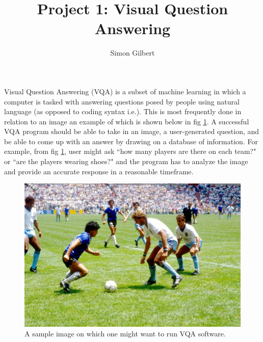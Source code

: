 \documentclass[manuscript,11pt]{article}
\begin{document}
\title{\Large Project 1: Visual Question Answering}
\author{Simon Gilbert}
\maketitle 
Visual Question Answering (VQA) is a subset of machine learning in which a computer is tasked with answering questions posed by people using natural language (as opposed to coding syntax i.e.).  This is most frequently done in relation to an image an example of which is shown below in fig \ref{soccer}. A successful VQA program should be able to take in an image, a user-generated question, and be able to come up with an answer by drawing on a database of information. For example, from fig \ref{soccer}, user might ask ``how many players are there on each team?" or  ``are the players wearing shoes?" and the program has to analyze the image and provide an accurate response in a reasonable timeframe. \\

\begin{figure}[h]
\centering
\includegraphics[scale=.8]{soccer}
\caption{A sample image on which one might want to run VQA software.}
\label{soccer}
\end{figure} 
\end{document}
